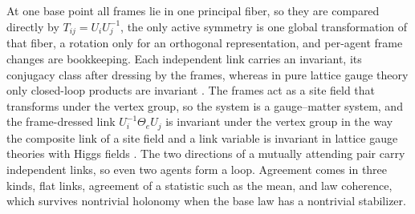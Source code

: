 At one base point all frames lie in one principal fiber, so they are compared directly by
$T_{ij}=U_iU_j^{-1}$, the only active symmetry is one global transformation of that fiber, a
rotation only for an orthogonal representation, and per-agent frame changes are bookkeeping. Each independent link carries an invariant, its conjugacy class after dressing by the
frames, whereas in pure lattice gauge theory only closed-loop products are invariant
\citep{WilsonConfinement1974}. The frames act as a site field that transforms under the vertex group, so
the system is a gauge--matter system, and the frame-dressed link $U_i^{-1}\Theta_eU_j$ is invariant under the vertex group in
the way the composite link of a site field and a link variable is invariant in lattice gauge theories
with Higgs fields \citep{OsterwalderSeiler1978,FradkinShenker1979}. The two directions of a mutually
attending pair carry independent links, so even two agents form a loop. Agreement comes in three kinds, flat links, agreement of a statistic such
as the mean, and law coherence, which survives nontrivial holonomy when the base law has a nontrivial
stabilizer.

